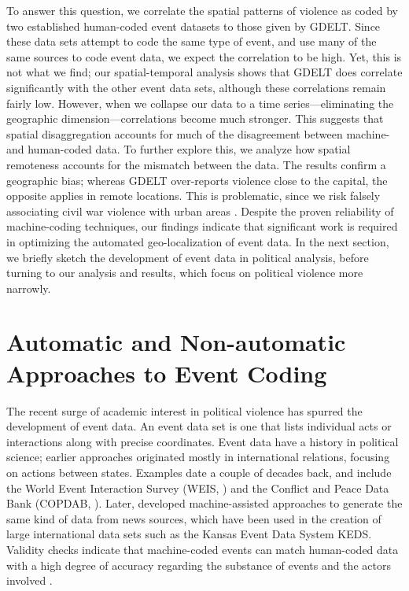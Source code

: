\documentclass[hidelinks]{article}
\begin{document}
To answer this question, we correlate the spatial patterns of violence as coded by two established human-coded event datasets to those given by GDELT. Since these data sets attempt to code the same type of event, and use many of the same sources to code event data, we expect the correlation to be high. Yet, this is not what we find; our spatial-temporal analysis shows that GDELT does correlate significantly with the other event data sets, although these correlations remain fairly low. However, when we collapse our data to a time series---eliminating the geographic dimension---correlations become much stronger. This suggests that spatial disaggregation accounts for much of the disagreement between machine- and human-coded data. To further explore this, we analyze how spatial remoteness accounts for the mismatch between the data. The results confirm a geographic bias; whereas GDELT over-reports violence close to the capital, the opposite applies in remote locations. This is problematic, since we risk falsely associating civil war violence with urban areas \citep{kalyvas04urban}. Despite the proven reliability of machine-coding techniques, our findings indicate that significant work is required in optimizing the automated geo-localization of event data. In the next section, we briefly sketch the development of event data in political analysis, before turning to our analysis and results, which focus on political violence more narrowly.

\section*{Automatic and Non-automatic Approaches to Event Coding}

The recent surge of academic interest in political violence has spurred the development of event data. An event data set is one that lists individual acts or interactions along with precise coordinates. Event data have a history in political science; earlier approaches originated mostly in international relations, focusing on actions between states. Examples date a couple of decades back, and include the World Event Interaction Survey (WEIS, \citealt{mcclelland71world}) and the Conflict and Peace Data Bank (COPDAB, \citealt{azar80conflict}). Later, \citet{schrodt94keds} developed machine-assisted approaches to generate the same kind of data from news sources, which have been used in the creation of large international data sets such as the Kansas Event Data System KEDS\citep{gerner94machine}. Validity checks indicate that machine-coded events can match human-coded data with a high degree of accuracy regarding the substance of events and the actors involved \citep{schrodt94validity, best13tabari}.
\end{document}
